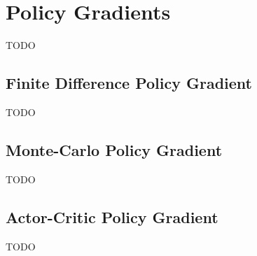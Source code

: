 \section{Policy Gradients}

TODO

\subsection{Finite Difference Policy Gradient}

TODO

\subsection{Monte-Carlo Policy Gradient}

TODO

\subsection{Actor-Critic Policy Gradient}

TODO
